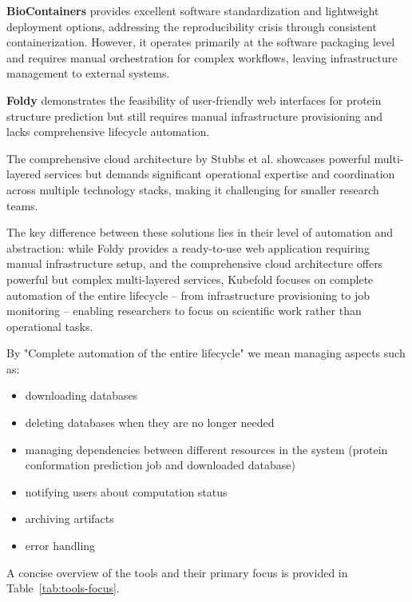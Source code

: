 \textbf{BioContainers} provides excellent software standardization and lightweight deployment options, addressing the reproducibility crisis through consistent containerization.
However, it operates primarily at the software packaging level and requires manual orchestration for complex workflows, leaving infrastructure management to external systems.

\textbf{Foldy} demonstrates the feasibility of user-friendly web interfaces for protein structure prediction but still requires manual infrastructure provisioning and lacks comprehensive lifecycle automation.

The comprehensive cloud architecture by Stubbs et al. showcases powerful multi-layered services but demands significant operational expertise and coordination across multiple technology stacks, making it challenging for smaller research teams.

The key difference between these solutions lies in their level of automation and abstraction: while Foldy provides a ready-to-use web application requiring manual infrastructure setup, and the comprehensive cloud architecture offers powerful but complex multi-layered services, Kubefold focuses on complete automation of the entire lifecycle -- from infrastructure provisioning to job monitoring -- enabling researchers to focus on scientific work rather than operational tasks.

By "Complete automation of the entire lifecycle" we mean managing aspects such as:
\begin{itemize}
  \item downloading databases
  \item deleting databases when they are no longer needed
  \item managing dependencies between different resources in the system (protein conformation prediction job and downloaded database)
  \item notifying users about computation status
  \item archiving artifacts
  \item error handling
\end{itemize}

A concise overview of the tools and their primary focus is provided in Table~\ref{tab:tools-focus}.

